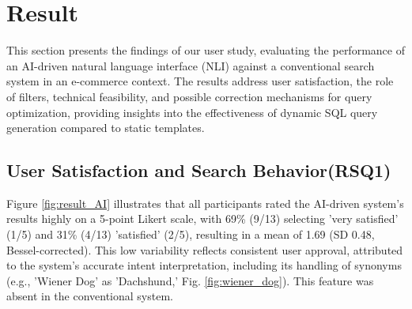 \documentclass[../../submission.tex]{subfiles}
\begin{document}
\section{Result}
This section presents the findings of our user study, evaluating the performance of an 
AI-driven natural language interface (NLI) against a conventional search system in 
an e-commerce context. The results address user satisfaction, the role of filters, 
technical feasibility, and possible correction mechanisms for query optimization, providing insights 
into the effectiveness of dynamic SQL query generation compared to static templates.

\subsection{User Satisfaction and Search Behavior(RSQ1)}
Figure \ref{fig:result_AI} illustrates that all participants rated the AI-driven system's 
results highly on a 5-point Likert scale, with 69\% (9/13) selecting 
'very satisfied' (1/5) and 31\% (4/13) 'satisfied' (2/5), resulting 
in a mean of 1.69 (SD 0.48, Bessel-corrected). 
This low variability reflects consistent user approval, 
attributed to the system's accurate intent interpretation, 
including its handling of synonyms (e.g., 'Wiener Dog' as 'Dachshund,' Fig. \ref{fig:wiener_dog}). 
This feature was absent in the conventional system.
\end{document}
